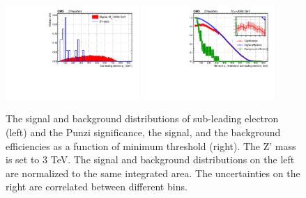 \begin{figure}[htbp]
   \centering
   \includegraphics[width=0.45\textwidth]{optimization/plot_2nd_pt/plot_2nd_pt_input_in_Zprime_mass_3000.pdf}
   \includegraphics[width=0.45\textwidth]{optimization/plot_2nd_pt/plot_2nd_pt_Significance_and_efficiency_for_Zprme_M_3000.pdf}
   \caption{The signal and background distributions of sub-leading electron \pt 
(left) and the Punzi significance, the signal, and the background efficiencies as a 
 function of minimum \pt threshold (right). The Z' mass is set to 3 TeV. The 
   signal and background distributions on the left are normalized to the same 
   integrated area. The uncertainties on the right are correlated between 
 different bins.}
   \label{fig:subptthree}
\end{figure}


